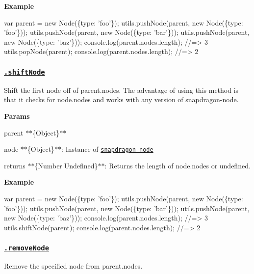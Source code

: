 {\bfseries Example}


\begin{DoxyCode}
var parent = new Node(\{type: 'foo'\});
utils.pushNode(parent, new Node(\{type: 'foo'\}));
utils.pushNode(parent, new Node(\{type: 'bar'\}));
utils.pushNode(parent, new Node(\{type: 'baz'\}));
console.log(parent.nodes.length); //=> 3
utils.popNode(parent);
console.log(parent.nodes.length); //=> 2
\end{DoxyCode}


\subsubsection*{\href{index.js#L382}{\tt .shift\+Node}}

Shift the first {\ttfamily node} off of {\ttfamily parent.\+nodes}. The advantage of using this method is that it checks for {\ttfamily node.\+nodes} and works with any version of {\ttfamily snapdragon-\/node}.

{\bfseries Params}


\begin{DoxyItemize}
\item {\ttfamily parent} $\ast$$\ast$\{Object\}$\ast$$\ast$
\item {\ttfamily node} $\ast$$\ast$\{Object\}$\ast$$\ast$\+: Instance of \href{https://github.com/jonschlinkert/snapdragon-node}{\tt snapdragon-\/node}
\item {\ttfamily returns} $\ast$$\ast$\{Number$\vert$\+Undefined\}$\ast$$\ast$\+: Returns the length of {\ttfamily node.\+nodes} or undefined.
\end{DoxyItemize}

{\bfseries Example}


\begin{DoxyCode}
var parent = new Node(\{type: 'foo'\});
utils.pushNode(parent, new Node(\{type: 'foo'\}));
utils.pushNode(parent, new Node(\{type: 'bar'\}));
utils.pushNode(parent, new Node(\{type: 'baz'\}));
console.log(parent.nodes.length); //=> 3
utils.shiftNode(parent);
console.log(parent.nodes.length); //=> 2
\end{DoxyCode}


\subsubsection*{\href{index.js#L409}{\tt .remove\+Node}}

Remove the specified {\ttfamily node} from {\ttfamily parent.\+nodes}.


